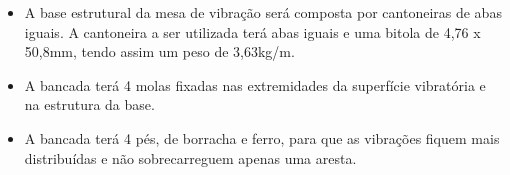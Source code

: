  \begin{itemize}
 \item A base estrutural da mesa de vibração será composta por cantoneiras de abas iguais. A cantoneira a ser utilizada terá abas iguais e uma bitola de 4,76 x 50,8mm, tendo assim um peso de 3,63kg/m.




\item A bancada terá 4 molas fixadas nas extremidades da superfície vibratória e na estrutura da base.%


\item A bancada terá 4 pés, de borracha e ferro, para que as vibrações fiquem mais distribuídas e não sobrecarreguem apenas uma aresta.


\end{itemize}

